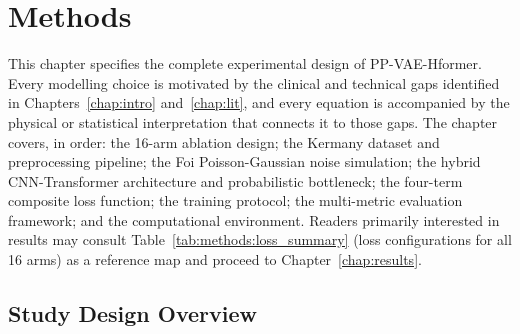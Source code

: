 \documentclass[12pt, a4paper, twoside, openright]{book}
\begin{document}
\chapter{Methods}
\label{chap:methods}

This chapter specifies the complete experimental design of PP-VAE-Hformer. Every modelling choice is motivated by the clinical and technical gaps identified in Chapters~\ref{chap:intro} and~\ref{chap:lit}, and every equation is accompanied by the physical or statistical interpretation that connects it to those gaps. The chapter covers, in order: the 16-arm ablation design; the Kermany dataset and preprocessing pipeline; the Foi Poisson-Gaussian noise simulation; the hybrid CNN-Transformer architecture and probabilistic bottleneck; the four-term composite loss function; the training protocol; the multi-metric evaluation framework; and the computational environment. Readers primarily interested in results may consult Table~\ref{tab:methods:loss_summary} (loss configurations for all 16 arms) as a reference map and proceed to Chapter~\ref{chap:results}.

\section{Study Design Overview}
\label{sec:methods:overview}
\end{document}

